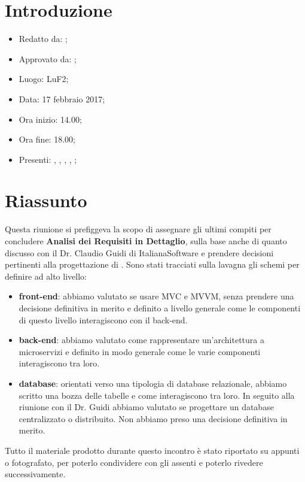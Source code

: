 \section{Introduzione}

	\begin{itemize}
		\item Redatto da: \MC;
		\item Approvato da: \AS;
		\item Luogo: LuF2;
		\item Data: 17 febbraio 2017;
		\item Ora inizio: 14.00;
		\item Ora fine: 18.00;
		\item Presenti: \AN, \DAN, \DS, \MC, \NS;		
	\end{itemize}

\section{Riassunto}
Questa riunione si prefiggeva la scopo di assegnare gli ultimi compiti per concludere \textbf{Analisi dei Requisiti in Dettaglio}, sulla base anche di quanto discusso con il Dr. Claudio Guidi di ItalianaSoftware e prendere decisioni pertinenti alla progettazione di \progetto. 
Sono stati tracciati sulla lavagna gli schemi per definire ad alto livello:
\begin{itemize}
	\item \textbf{front-end}: abbiamo valutato se usare MVC e MVVM, senza prendere una decisione definitiva in merito e definito a livello generale come le componenti di questo livello interagiscono con il back-end. 
	\item \textbf{back-end}: abbiamo valutato come rappresentare un'architettura a microservizi e definito in modo generale come le varie componenti interagiscono tra loro. 
	\item \textbf{database}: orientati verso una tipologia di database relazionale, abbiamo scritto una bozza delle tabelle e come interagiscono tra loro. In seguito alla riunione con il Dr. Guidi abbiamo valutato se progettare un database centralizzato o distribuito. Non abbiamo preso una decisione definitiva in merito.
\end{itemize}
Tutto il materiale prodotto durante questo incontro è stato riportato su appunti o fotografato, per poterlo condividere con gli assenti e poterlo rivedere successivamente.
